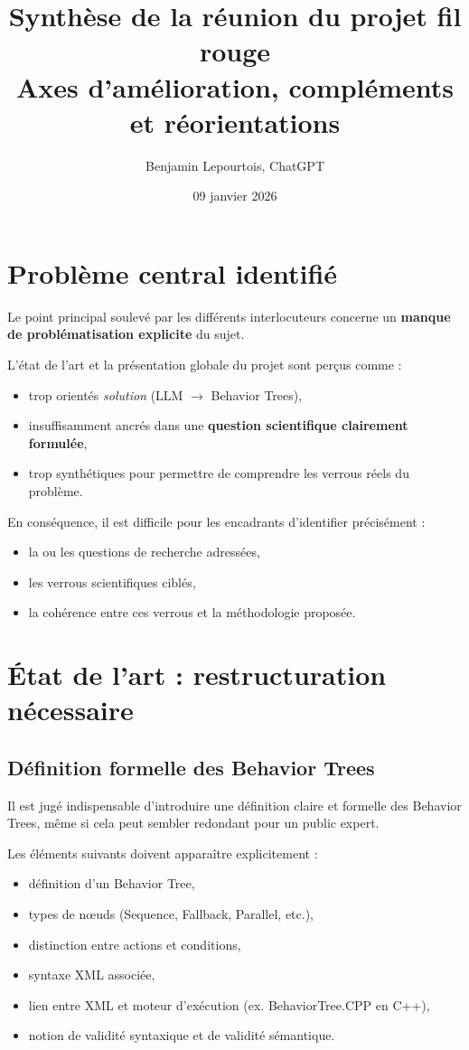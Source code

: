 \documentclass[11pt,a4paper]{article}
\title{Synthèse de la réunion du projet fil rouge \\ 
Axes d'amélioration, compléments et réorientations}
\author{Benjamin Lepourtois, ChatGPT}
\date{09 janvier 2026}
\begin{document}
\maketitle

\section{Problème central identifié}

Le point principal soulevé par les différents interlocuteurs concerne un \textbf{manque de problématisation explicite} du sujet.

L’état de l’art et la présentation globale du projet sont perçus comme :
\begin{itemize}
    \item trop orientés \textit{solution} (LLM $\rightarrow$ Behavior Trees),
    \item insuffisamment ancrés dans une \textbf{question scientifique clairement formulée},
    \item trop synthétiques pour permettre de comprendre les verrous réels du problème.
\end{itemize}

En conséquence, il est difficile pour les encadrants d’identifier précisément :
\begin{itemize}
    \item la ou les questions de recherche adressées,
    \item les verrous scientifiques ciblés,
    \item la cohérence entre ces verrous et la méthodologie proposée.
\end{itemize}

\section{État de l’art : restructuration nécessaire}

\subsection{Définition formelle des Behavior Trees}

Il est jugé indispensable d’introduire une définition claire et formelle des Behavior Trees, même si cela peut sembler redondant pour un public expert.

Les éléments suivants doivent apparaître explicitement :
\begin{itemize}
    \item définition d’un Behavior Tree,
    \item types de nœuds (Sequence, Fallback, Parallel, etc.),
    \item distinction entre actions et conditions,
    \item syntaxe XML associée,
    \item lien entre XML et moteur d’exécution (ex. BehaviorTree.CPP en C++),
    \item notion de validité syntaxique et de validité sémantique.
\end{itemize}
\end{document}
